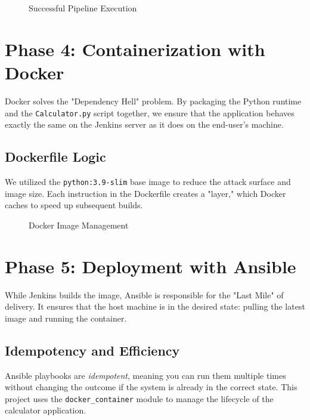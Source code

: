 \documentclass[12pt]{article}
\begin{document}
\vspace{1cm}
\begin{figure}[h]
    \centering
    \caption{Successful Pipeline Execution}
\end{figure}

\section{Phase 4: Containerization with Docker}
Docker solves the "Dependency Hell" problem. By packaging the Python runtime and the \texttt{Calculator.py} script together, we ensure that the application behaves exactly the same on the Jenkins server as it does on the end-user's machine.

\subsection{Dockerfile Logic}
We utilized the \texttt{python:3.9-slim} base image to reduce the attack surface and image size. Each instruction in the Dockerfile creates a "layer," which Docker caches to speed up subsequent builds.

\vspace{1cm}
\begin{figure}[h]
    \centering
    \caption{Docker Image Management}
\end{figure}

\section{Phase 5: Deployment with Ansible}
While Jenkins builds the image, Ansible is responsible for the "Last Mile" of delivery. It ensures that the host machine is in the desired state: pulling the latest image and running the container.

\subsection{Idempotency and Efficiency}
Ansible playbooks are \textit{idempotent}, meaning you can run them multiple times without changing the outcome if the system is already in the correct state. This project uses the \texttt{docker\_container} module to manage the lifecycle of the calculator application.
\end{document}
